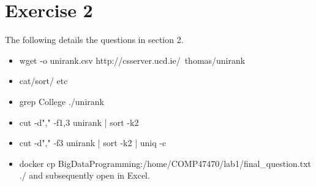 \documentclass{scrreprt}
\begin{document}
\section{Exercise 2}\label{Overview}
The following details the questions in section 2.
\begin{itemize}
	\item  wget -o unirank.csv http://csserver.ucd.ie/~thomas/unirank
	\item cat/sort/ etc
	\item grep College ./unirank
	\item cut -d"," -f1,3 unirank | sort -k2 
	\item  cut -d"," -f3 unirank | sort -k2 | uniq -c
	\item  docker cp BigDataProgramming:/home/COMP47470/lab1/final\_question.txt ./ and subsequently open in Excel.
\end{itemize}
\end{document}
